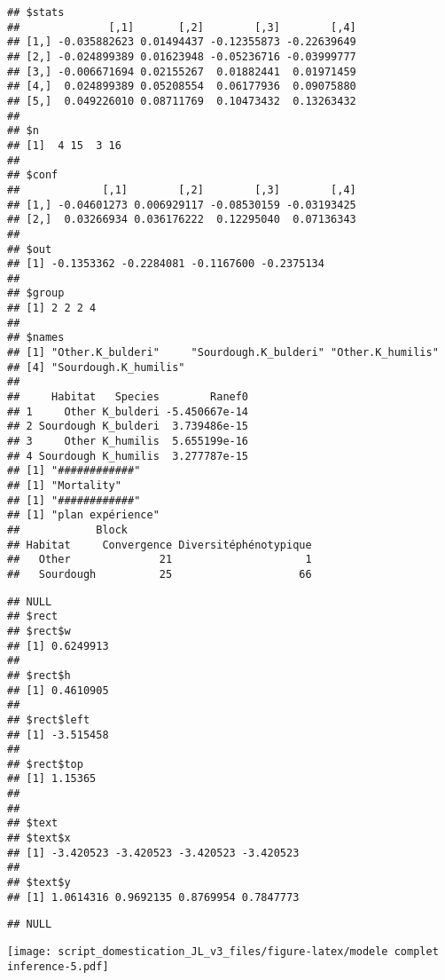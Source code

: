 \documentclass[
]{article}
\begin{document}
\begin{verbatim}
## $stats
##              [,1]       [,2]        [,3]        [,4]
## [1,] -0.035882623 0.01494437 -0.12355873 -0.22639649
## [2,] -0.024899389 0.01623948 -0.05236716 -0.03999777
## [3,] -0.006671694 0.02155267  0.01882441  0.01971459
## [4,]  0.024899389 0.05208554  0.06177936  0.09075880
## [5,]  0.049226010 0.08711769  0.10473432  0.13263432
## 
## $n
## [1]  4 15  3 16
## 
## $conf
##             [,1]        [,2]        [,3]        [,4]
## [1,] -0.04601273 0.006929117 -0.08530159 -0.03193425
## [2,]  0.03266934 0.036176222  0.12295040  0.07136343
## 
## $out
## [1] -0.1353362 -0.2284081 -0.1167600 -0.2375134
## 
## $group
## [1] 2 2 2 4
## 
## $names
## [1] "Other.K_bulderi"     "Sourdough.K_bulderi" "Other.K_humilis"    
## [4] "Sourdough.K_humilis"
## 
##     Habitat   Species        Ranef0
## 1     Other K_bulderi -5.450667e-14
## 2 Sourdough K_bulderi  3.739486e-15
## 3     Other K_humilis  5.655199e-16
## 4 Sourdough K_humilis  3.277787e-15
## [1] "############"
## [1] "Mortality"
## [1] "############"
## [1] "plan expérience"
##            Block
## Habitat     Convergence Diversitéphénotypique
##   Other              21                     1
##   Sourdough          25                    66
\end{verbatim}

\begin{verbatim}
## NULL
## $rect
## $rect$w
## [1] 0.6249913
## 
## $rect$h
## [1] 0.4610905
## 
## $rect$left
## [1] -3.515458
## 
## $rect$top
## [1] 1.15365
## 
## 
## $text
## $text$x
## [1] -3.420523 -3.420523 -3.420523 -3.420523
## 
## $text$y
## [1] 1.0614316 0.9692135 0.8769954 0.7847773
\end{verbatim}

\begin{verbatim}
## NULL
\end{verbatim}

\texttt{[image: script\_domestication\_JL\_v3\_files/figure-latex/modele complet inference-5.pdf]}
\end{document}
